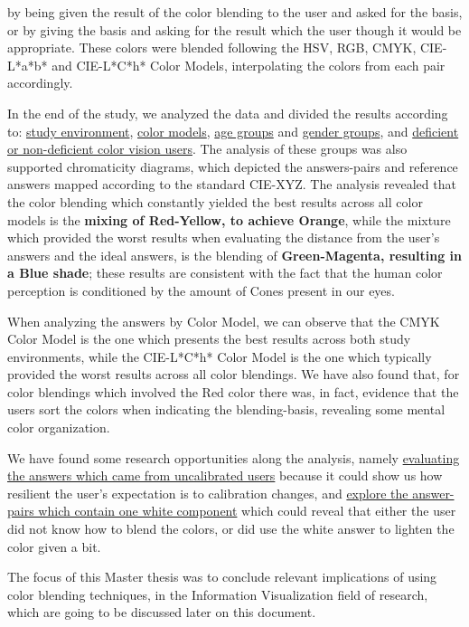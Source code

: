 by being given the result of the color blending to the user and asked for the basis, or by giving the basis and asking
for the result which the user though it would be appropriate. These colors were blended following the HSV, RGB, CMYK,
CIE-L*a*b* and CIE-L*C*h* Color Models, interpolating the colors from each pair accordingly. \par
%
In the end of the study, we analyzed the data and divided the results according to: \ul{study environment}, \ul{color
models}, \ul{age groups} and \ul{gender groups}, and \ul{deficient or non-deficient color vision users}. The analysis
of these groups was also supported chromaticity diagrams, which depicted the answers-pairs and reference answers
mapped according to the standard CIE-XYZ. The analysis revealed that the color blending which constantly yielded the
best results across all color models is the \textbf{mixing of Red-Yellow, to achieve Orange}, while the mixture which
provided the worst results when evaluating the distance from the user’s answers and the ideal answers, is the blending
of \textbf{Green-Magenta, resulting in a Blue shade}; these results are consistent with the fact that the human color
perception is conditioned by the amount of Cones present in our eyes. \par
%
When analyzing the answers by Color Model, we can observe that the CMYK Color Model is the one which presents the best
results across both study environments, while the CIE-L*C*h* Color Model is the one which typically provided the worst
results across all color blendings. We have also found that, for color blendings which involved the Red color there was,
in fact, evidence that the users sort the colors when indicating the blending-basis, revealing some mental color organization. \par
%
We have found some research opportunities along the analysis, namely \ul{evaluating the answers which came from
uncalibrated users} because it could show us how resilient the user's expectation is to calibration changes, and \ul{explore
the answer-pairs which contain one white component} which could reveal that either the user did not know how to blend
the colors, or did use the white answer to lighten the color given a bit. \par
%
The focus of this Master thesis was to conclude relevant implications of using color blending techniques, in the Information
Visualization field of research, which are going to be discussed later on this document.
%
